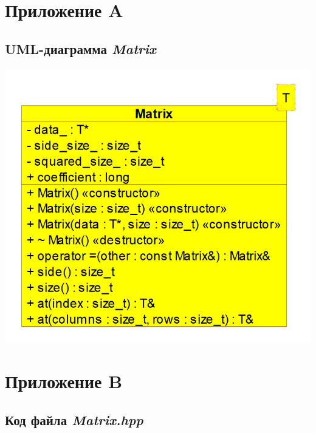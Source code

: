 \documentclass[a4paper, 12pt]{article}
\begin{document}
\cleardoublepage


\section*{Приложение A}
\renewcommand\thesection{\Alph{section}}
\renewcommand\thesubsection{\thesection.\arabic{subsection}}
\setcounter{subsection}{0}

\subsection{UML-диаграмма \textit{Matrix}}
\includegraphics[width=\columnwidth]{uml.png}


\cleardoublepage

\setcounter{subsection}{0}
\section*{Приложение B}
\renewcommand\thesection{\Alph{section}}
\renewcommand\thesubsection{B.1}

\subsection{Код файла \textit{Matrix.hpp}}
\end{document}
